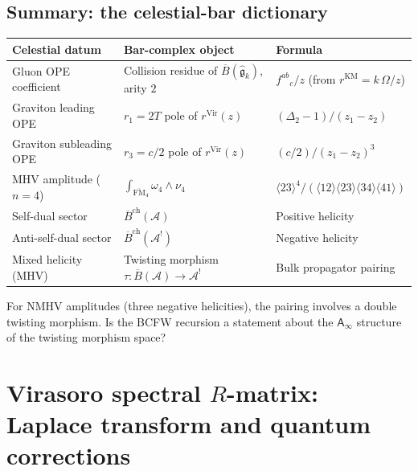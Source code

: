 \documentclass[11pt]{article}
\newcommand{\cA}{\mathcal{A}}
\newcommand{\fg}{\mathfrak{g}}
\newcommand{\barB}{\overline{B}}
\newcommand{\Ainf}{\mathsf{A}_{\infty}}
\begin{document}
\subsection{Summary: the celestial-bar dictionary}
\label{subsec:celestial-bar-dictionary-cel}

\medskip
\begin{center}
\small
\renewcommand{\arraystretch}{1.4}
\begin{tabular}{p{3.5cm}p{3.5cm}p{4.5cm}}
\textbf{Celestial datum} &
\textbf{Bar-complex object} &
\textbf{Formula} \\
\hline
Gluon OPE coefficient &
Collision residue of
  $\barB(\widehat{\fg}_k)$, arity $2$ &
$f^{ab}{}_c / z$
  (from $r^{\mathrm{KM}} = k\,\Omega/z$) \\[4pt]
Graviton leading OPE &
$r_1 = 2T$ pole of
  $r^{\mathrm{Vir}}(z)$ &
$(\Delta_2 - 1) / (z_1 - z_2)$ \\[4pt]
Graviton subleading OPE &
$r_3 = c/2$ pole of
  $r^{\mathrm{Vir}}(z)$ &
$(c/2) / (z_1 - z_2)^3$ \\[4pt]
MHV amplitude ($n = 4$) &
$\int_{\overline{\mathrm{FM}}_4}
  \omega_4 \wedge \nu_4$ &
$\langle 23\rangle^4 / (\langle 12\rangle
  \langle 23\rangle \langle 34\rangle
  \langle 41\rangle)$ \\[4pt]
Self-dual sector &
$\barB^{\mathrm{ch}}(\cA)$ &
Positive helicity \\[4pt]
Anti-self-dual sector &
$\barB^{\mathrm{ch}}(\cA^!)$ &
Negative helicity \\[4pt]
Mixed helicity (MHV) &
Twisting morphism
  $\tau: \barB(\cA) \to \cA^!$ &
Bulk propagator pairing
\end{tabular}
\end{center}

\begin{question}
\label{q:higher-mhv-cel}
For NMHV amplitudes (three negative helicities), the pairing involves a
double twisting morphism.  Is the BCFW recursion a statement about
the $\Ainf$ structure of the twisting morphism space?
\end{question}




\section{Virasoro spectral $R$-matrix: Laplace transform and quantum corrections}
\label{sec:virasoro-spectral-R}
\end{document}

